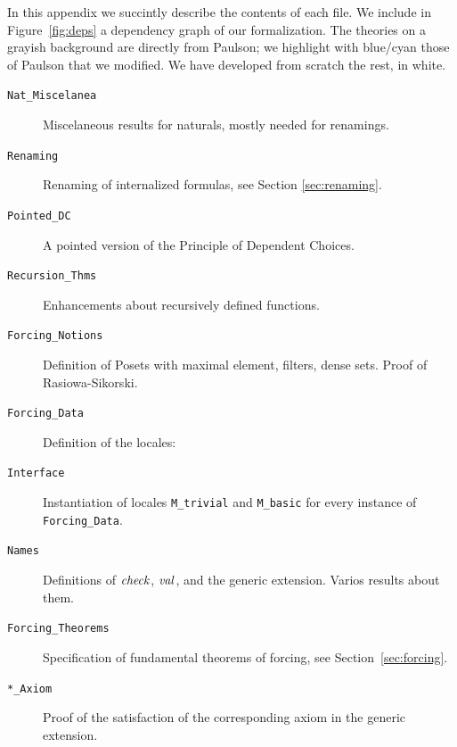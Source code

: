 In this appendix we succintly describe the contents of each file. We
include in 
Figure~\ref{fig:deps}  a dependency graph of our formalization. The
theories on a grayish background are directly from Paulson; we
highlight with blue/cyan those of Paulson that we modified. We
have developed from scratch the rest, in white.

\begin{description}
\item[\texttt{Nat\_Miscelanea}]Miscelaneous results for naturals, mostly
  needed for renamings.
\item[\texttt{Renaming}] Renaming of internalized formulas, see
  Section \ref{sec:renaming}.
\item[\texttt{Pointed\_DC}] A pointed version of the Principle of
  Dependent Choices.
\item[\texttt{Recursion\_Thms}] Enhancements about recursively defined
  functions.
\item[\texttt{Forcing\_Notions}] Definition of Posets with maximal
  element, filters, dense sets. Proof of Rasiowa-Sikorski.
\item[\texttt{Forcing\_Data}] Definition of the locales:
\item[\texttt{Interface}] Instantiation of locales \texttt{M\_trivial}
  and \texttt{M\_basic} for every instance of \texttt{Forcing\_Data}.
\item[\texttt{Names}] Definitions of $\operatorname{\mathit{check}}$, $\operatorname{\mathit{val}}$, and the generic
  extension. Varios results about them.
\item[\texttt{Forcing\_Theorems}] Specification of fundamental
  theorems of forcing, see Section~\ref{sec:forcing}.
\item[\texttt{*\_Axiom}] Proof of the satisfaction of the
  corresponding axiom in the generic extension.
\end{description}
%

